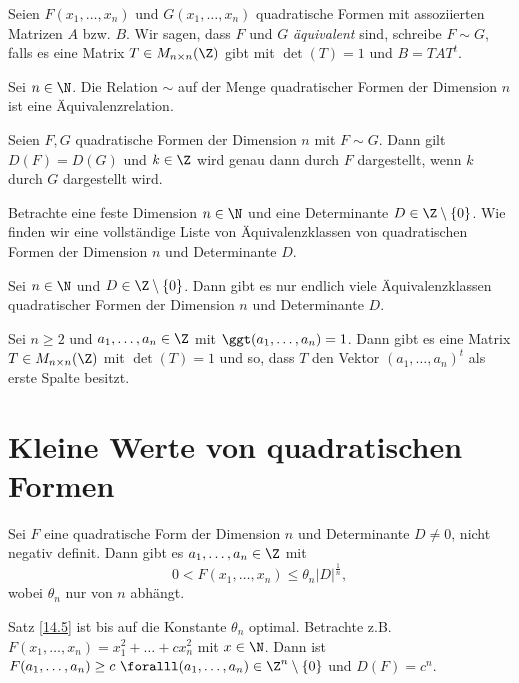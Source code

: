 \begin{defn*}
	Seien $F(x_1,\dotsc,x_n)$ und $G(x_1,\dotsc,x_n)$ quadratische Formen mit assoziierten Matrizen $A$ bzw. $B$. Wir sagen, dass $F$ und $G$ \emph{äquivalent} sind, schreibe $F \sim G$, falls es eine Matrix $T \in M_{n \times n}(\Z)$ gibt mit $\det(T) = 1$ und $B = TAT^t$.
\end{defn*}

\begin{lem}\autolabel
	Sei $n \in \N$. Die Relation $\sim$ auf der Menge quadratischer Formen der Dimension $n$ ist eine Äquivalenzrelation.
\end{lem}

\begin{lem}\autolabel
	Seien $F,G$ quadratische Formen der Dimension $n$ mit $F \sim G$. Dann gilt $D(F) = D(G)$ und $k \in \Z$ wird genau dann durch $F$ dargestellt, wenn $k$ durch $G$ dargestellt wird.
\end{lem}

\begin{frage*}
	Betrachte eine feste Dimension $n \in \N$ und eine Determinante $D \in \Z \setminus \{0\}$. Wie finden wir eine vollständige Liste von Äquivalenzklassen von quadratischen Formen der Dimension $n$ und Determinante $D$.
\end{frage*}

\begin{thm}\autolabel
	Sei $n \in \N$ und $D \in \Z\setminus\{0\}$. Dann gibt es nur endlich viele Äquivalenzklassen quadratischer Formen der Dimension $n$ und Determinante $D$.
\end{thm}

\begin{lem}\autolabel
	Sei $n \geq 2$ und $a_1,\dotsc,a_n \in \Z$ mit $\ggt(a_1,\dotsc,a_n)=1$. Dann gibt es eine Matrix $T \in M_{n \times n}(\Z)$ mit $\det(T)  =1$ und so, dass $T$ den Vektor $(a_1,\dotsc,a_n)^t$ als erste Spalte besitzt.
\end{lem}

\section{Kleine Werte von quadratischen Formen}

\begin{thm}\autolabel
	Sei $F$ eine quadratische Form der Dimension $n$ und Determinante $D \neq 0$, nicht negativ definit. Dann gibt es $a_1, \dotsc, a_n \in \Z$ mit
	\[ 0 < F(x_1,\dotsc,x_n) \leq \theta_n |D|^\frac{1}{n}, \]
	wobei $\theta_n$ nur von $n$ abhängt.
\end{thm}

\begin{rem*}
	Satz \ref{14.5} ist bis auf die Konstante $\theta_n$ optimal. Betrachte z.B. $F(x_1,\dotsc,x_n) = x_1^2 + \dotsc + cx_n^2$ mit $x \in \N$. Dann ist $F(a_1,\dotsc,a_n) \geq c \ \foralll (a_1,\dotsc,a_n) \in \Z^n \setminus \{0\}$ und $D(F) = c^n$.
\end{rem*}